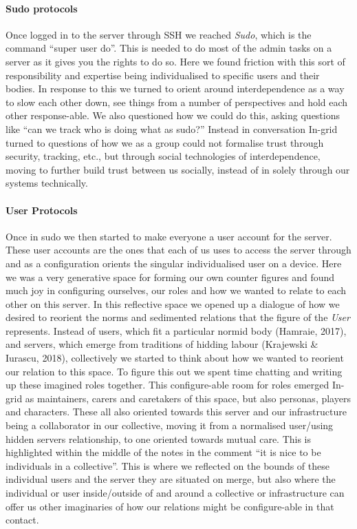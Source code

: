 \hypertarget{sudo-protocols}{%
\paragraph{Sudo protocols}\label{sudo-protocols}}

Once logged in to the server through SSH we reached \emph{Sudo}, which
is the command ``super user do''. This is needed to do most of the admin
tasks on a server as it gives you the rights to do so. Here we found
friction with this sort of responsibility and expertise being
individualised to specific users and their bodies. In response to this
we turned to orient around interdependence as a way to slow each other
down, see things from a number of perspectives and hold each other
response-able. We also questioned how we could do this, asking questions
like ``can we track who is doing what as sudo?'' Instead in conversation
In-grid turned to questions of how we as a group could not formalise
trust through security, tracking, etc., but through social technologies
of interdependence, moving to further build trust between us socially,
instead of in solely through our systems technically.

\hypertarget{user-protocols}{%
\paragraph{User Protocols}\label{user-protocols}}

Once in sudo we then started to make everyone a user account for the
server. These user accounts are the ones that each of us uses to access
the server through and as a configuration orients the singular
individualised user on a device. Here we was a very generative space for
forming our own counter figures and found much joy in configuring
ourselves, our roles and how we wanted to relate to each other on this
server. In this reflective space we opened up a dialogue of how we
desired to reorient the norms and sedimented relations that the figure
of the \emph{User} represents. Instead of users, which fit a particular
normid body (Hamraie, 2017), and servers, which emerge from traditions
of hidding labour (Krajewski \& Iurascu, 2018), collectively we started
to think about how we wanted to reorient our relation to this space. To
figure this out we spent time chatting and writing up these imagined
roles together. This configure-able room for roles emerged In-grid as
maintainers, carers and caretakers of this space, but also personas,
players and characters. These all also oriented towards this server and
our infrastructure being a collaborator in our collective, moving it
from a normalised user/using hidden servers relationship, to one
oriented towards mutual care. This is highlighted within the middle of
the notes in the comment ``it is nice to be individuals in a
collective''. This is where we reflected on the bounds of these
individual users and the server they are situated on merge, but also
where the individual or user inside/outside of and around a collective
or infrastructure can offer us other imaginaries of how our relations
might be configure-able in that contact.

